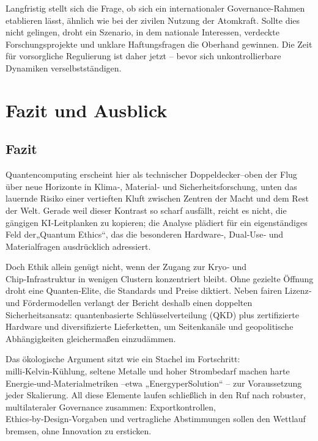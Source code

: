 {Langfristig stellt sich die Frage, ob sich ein internationaler Governance-Rahmen etablieren lässt, ähnlich wie bei der zivilen Nutzung der Atomkraft. Sollte dies nicht gelingen, droht ein Szenario, in dem nationale Interessen, verdeckte Forschungsprojekte und unklare Haftungsfragen die Oberhand gewinnen. Die Zeit für vorsorgliche Regulierung ist daher jetzt – bevor sich unkontrollierbare Dynamiken verselbstständigen.

 


 

 
 

 

\section{Fazit und Ausblick}
\subsection{Fazit}


Quantencomputing erscheint hier als technischer Doppeldecker–oben der Flug über neue Horizonte in Klima‑, Material‑ und Sicherheitsforschung, unten das lauernde Risiko einer vertieften Kluft zwischen Zentren der Macht und dem Rest der Welt. Gerade weil dieser Kontrast so scharf ausfällt, reicht es nicht, die gängigen KI‑Leitplanken zu kopieren; die Analyse plädiert für ein eigenständiges Feld der„Quantum Ethics“, das die besonderen Hardware‑, Dual‑Use‑ und Materialfragen ausdrücklich adressiert.

Doch Ethik allein genügt nicht, wenn der Zugang zur Kryo‑ und Chip‑Infrastruktur in wenigen Clustern konzentriert bleibt. Ohne gezielte Öffnung droht eine Quanten‑Elite, die Standards und Preise diktiert. Neben fairen Lizenz‑ und Fördermodellen verlangt der Bericht deshalb einen doppelten Sicherheitsansatz: quantenbasierte Schlüsselverteilung (QKD) plus zertifizierte Hardware und diversifizierte Lieferketten, um Seitenkanäle und geopolitische Abhängigkeiten gleichermaßen einzudämmen.

Das ökologische Argument sitzt wie ein Stachel im Fortschritt: milli‑Kelvin‑Kühlung, seltene Metalle und hoher Strombedarf machen harte Energie‑und‑Materialmetriken –etwa „EnergyperSolution“ – zur Voraussetzung jeder Skalierung. All diese Elemente laufen schließlich in den Ruf nach robuster, multilateraler Governance zusammen: Exportkontrollen, Ethics‑by‑Design‑Vorgaben und vertragliche Abstimmungen sollen den Wettlauf bremsen, ohne Innovation zu ersticken.

}
